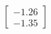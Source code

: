 \documentclass[preview]{standalone}
\begin{document}
\begin{align*}
\begin{bmatrix} -1.26 \\ -1.35 \end{bmatrix}
\end{align*}
\end{document}
